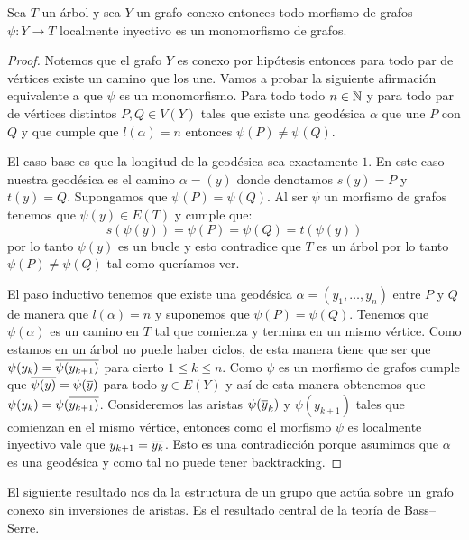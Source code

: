 \documentclass[tesis.tex]{subfiles}
\begin{document}
\begin{prop}\label{prop_loc_iny}
	Sea $T$ un árbol y sea $Y$ un grafo conexo entonces todo morfismo de grafos $\psi:Y \to T$ localmente inyectivo es un monomorfismo de grafos.    
\end{prop}
\begin{proof}
	Notemos que el grafo $Y$ es conexo por hipótesis entonces para todo par de vértices existe un camino que los une.
	Vamos a probar la siguiente afirmación equivalente a que $\psi$ es un monomorfismo. 
	Para todo todo $n \in \mathbb{N}$ y para todo par de vértices distintos $P,Q \in V(Y)$  tales que existe una geodésica $\alpha$ que une $P$ con $Q$ y que cumple que $l(\alpha) = n$ entonces  $\psi(P) \neq \psi(Q)$.	
		
	
	El caso base es que la longitud de la geodésica sea exactamente $1$.
	En este caso nuestra geodésica es el camino $\alpha = (y)$ donde denotamos $s(y)= P$ y $t(y) = Q$.
	Supongamos que $\psi(P) = \psi(Q)$. 
	Al ser $\psi$ un morfismo de grafos tenemos que $\psi(y) \in E(T)$ y cumple que: 
	\begin{equation*}
		s(\psi(y)) = \psi(P) = \psi(Q) = t(\psi(y))
	\end{equation*}
	por lo tanto $\psi(y)$ es un bucle y esto contradice que $T$ es un árbol por lo tanto $\psi(P) \neq \psi(Q)$ tal como queríamos ver.
	
	
	El paso inductivo tenemos que existe una geodésica $\alpha= (y_1, \dots, y_n)$ entre $P$ y $Q$ de manera que $l(\alpha) = n$ y suponemos que $\psi(P) = \psi(Q)$.
	Tenemos que $\psi(\alpha)$ es un camino en $T$ tal que comienza y termina en un mismo vértice.
	Como estamos en un árbol no puede haber ciclos, de esta manera tiene que ser que $\psi(y_k) = \overline{\psi (y_{k+1})}$ para cierto $1 \le k \le n$.
	Como $\psi$ es un morfismo de grafos cumple que $\overline {\psi(y)} = \psi(\overline y)$ para todo $y \in E(Y)$ y así de esta manera obtenemos que $\psi(y_k) =  \psi(\overline{y_{k+1})}$.
	Consideremos las aristas $\psi(\overline y_{k})$ y $\psi(y_{k+1})$ tales que comienzan en el mismo vértice, entonces como el morfismo $\psi$ es localmente inyectivo vale que $y_{k+1} = \overline{y_k}$. 
	Esto es una contradicción porque asumimos que $\alpha$ es una geodésica y como tal no puede tener backtracking.    
	
\end{proof}

El siguiente resultado nos da la estructura de un grupo que actúa sobre un grafo conexo sin inversiones de aristas. 
Es el resultado central de la teoría de Bass--Serre.
\end{document}
